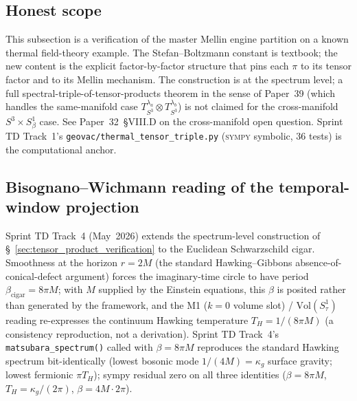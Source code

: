 \documentclass[11pt]{article}
\begin{document}
\subsection{Honest scope}
\label{subsec:tensor_scope}

This subsection is a verification of the master Mellin engine
partition on a known thermal field-theory example.  The
Stefan--Boltzmann constant is textbook; the new content is the
explicit factor-by-factor structure that pins each $\pi$ to its
tensor factor and to its Mellin mechanism.  The construction is at
the spectrum level; a full spectral-triple-of-tensor-products theorem
in the sense of Paper~39 (which handles the same-manifold case
$T_{S^3}^{\lambda_a}\otimes T_{S^3}^{\lambda_b}$) is not claimed for
the cross-manifold $S^3 \times S^1_\beta$ case.  See Paper~32~§VIII.D
on the cross-manifold open question.  Sprint TD Track~1's
\verb|geovac/thermal_tensor_triple.py| (\textsc{sympy} symbolic, 36
tests) is the computational anchor.

\subsection{Bisognano--Wichmann reading of the temporal-window projection}
\label{subsec:bisognano_wichmann_reading}

Sprint TD Track~4 (May~2026)
extends the spectrum-level construction of
\S~\ref{sec:tensor_product_verification} to the Euclidean Schwarzschild
cigar.  Smoothness at the horizon $r = 2M$ (the standard Hawking--Gibbons
absence-of-conical-defect argument) forces the imaginary-time circle to
have period $\beta_{\mathrm{cigar}} = 8\pi M$; with $M$ supplied by the
Einstein equations, this $\beta$ is posited rather than generated by
the framework, and the M1 ($k = 0$ volume slot) /
$\mathrm{Vol}(S^1_\tau)$ reading re-expresses the continuum Hawking
temperature $T_H = 1/(8\pi M)$ (a consistency reproduction, not a
derivation).  Sprint TD Track~4's
\texttt{matsubara\_spectrum()} called with $\beta = 8\pi M$ reproduces the
standard Hawking spectrum bit-identically (lowest bosonic mode $1/(4M) =
\kappa_g$ surface gravity; lowest fermionic $\pi T_H$); sympy residual
zero on all three identities ($\beta = 8\pi M$,
$T_H = \kappa_g/(2\pi)$, $\beta = 4M \cdot 2\pi$).
\end{document}

